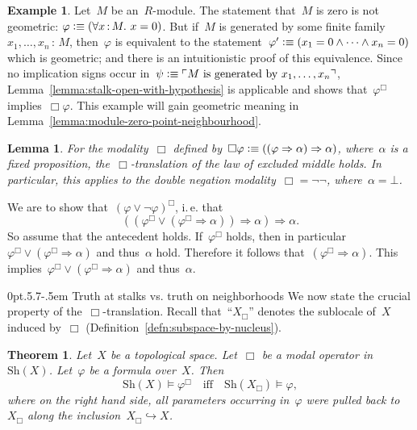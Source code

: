 \documentclass[10pt,reqno,a4paper]{amsbook}
\makeatletter
\theoremstyle{definition}
\newtheorem{ex}[defn]{Example}
\theoremstyle{plain}
\newtheorem{lemma}[defn]{Lemma}
\newtheorem{thm}[defn]{Theorem}
\theoremstyle{remark}
\newcommand{\Sh}{\mathrm{Sh}}
\newcommand{\?}{\,{:}\,}
\renewcommand{\_}{\mathpunct{.}\,}
\newcommand{\speak}[1]{\ulcorner\text{\textnormal{#1}}\urcorner}
\newcommand{\ie}{i.\,e.\@\xspace}
\newcommand{\vs}{vs.\@\xspace}
\newcommand{\defequiv}{\vcentcolon\equiv}
\renewenvironment{proof}[1][\proofname]{\par
  \pushQED{\qed}%
  \normalfont \topsep6\p@\@plus6\p@\relax
  \trivlist
  \item[\hskip\labelsep
        \itshape
    #1\@addpunct{.}]\ignorespaces
}{%
  \popQED\endtrivlist\@endpefalse
}
\def\subsection{\@startsection{subsection}{2}%
  {0pt}{.5\linespacing\@plus.7\linespacing}{-.5em}%
  {\normalfont\bfseries}}
\makeatother
\begin{document}
\begin{ex}\label{ex:module-zero-geometric}
Let~$M$ be an~$R$-module. The statement that~$M$ is zero is not
geometric: $\varphi \defequiv (\forall x\?M\_ x = 0)$. But if~$M$ is generated by some finite
family~$x_1,\ldots,x_n\?M$, then~$\varphi$ is equivalent to the
statement~$\varphi' \defequiv (x_1 = 0
\wedge \cdots \wedge x_n = 0)$ which is geometric; and there is an
intuitionistic proof of this equivalence. Since no implication signs occur
in~$\psi \defequiv \speak{$M$ is generated by~$x_1,\ldots,x_n$}$, Lemma~\ref{lemma:stalk-open-with-hypothesis} is
applicable and shows that~$\varphi^\Box$ implies~$\Box\varphi$.
This example will gain geometric meaning in
Lemma~\ref{lemma:module-zero-point-neighbourhood}.
\end{ex}

\begin{lemma}For the modality~$\Box$ defined by~$\Box\varphi \defequiv ((\varphi
      \Rightarrow \alpha) \Rightarrow \alpha)$, where~$\alpha$ is a fixed
proposition, the~$\Box$-translation of the law of excluded middle holds.
In particular, this applies to the double negation modality~$\Box = \neg\neg$, where~$\alpha =
\bot$.\end{lemma}
\begin{proof}We are to show that~$(\varphi \vee \neg\varphi)^\Box$, \ie that
\[ ((\varphi^\Box \vee (\varphi^\Box \Rightarrow \alpha)) \Longrightarrow
    \alpha) \Longrightarrow \alpha. \]
So assume that the antecedent holds. If~$\varphi^\Box$ holds, then in
particular~$\varphi^\Box \vee (\varphi^\Box \Rightarrow \alpha)$ and thus~$\alpha$
hold. Therefore it follows that~$(\varphi^\Box \Rightarrow \alpha)$. This
implies~$\varphi^\Box \vee (\varphi^\Box \Rightarrow \alpha)$ and
thus~$\alpha$.
\end{proof}


\subsection{\texorpdfstring{Truth at stalks \vs truth on neighborhoods}{Truth
at stalks vs. truth on neighborhoods}}\label{sect:spreading}
We now state the crucial property of the~$\Box$-translation. Recall
that~``$X_\Box$'' denotes the sublocale of~$X$ induced by~$\Box$
(Definition~\ref{defn:subspace-by-nucleus}).
\begin{thm}\label{thm:box-translation-semantically}
Let~$X$ be a topological space. Let~$\Box$ be a modal operator
in~$\Sh(X)$. Let~$\varphi$ be a formula over~$X$. Then
\[ \Sh(X) \models \varphi^\Box \quad\text{iff}\quad
  \Sh(X_\Box) \models \varphi, \]
where on the right hand side, all parameters occurring in~$\varphi$ were pulled
back to~$X_\Box$ along the inclusion~$X_\Box \hookrightarrow X$.
\end{thm}
\end{document}
